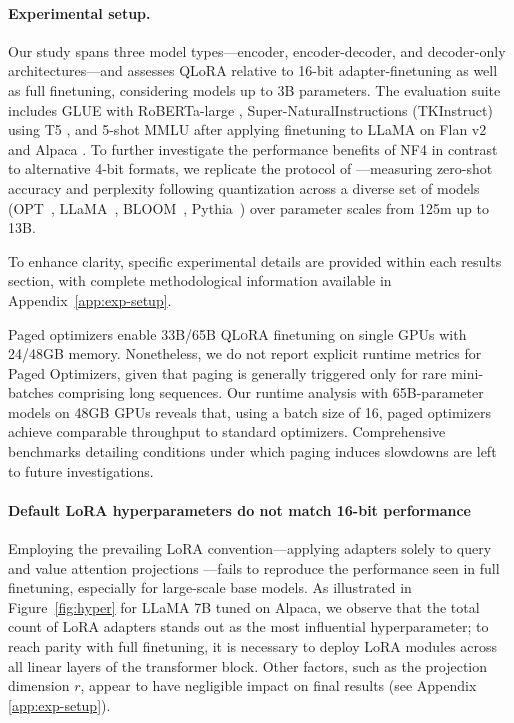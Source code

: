 \paragraph{Experimental setup.} Our study spans three model types—encoder, encoder-decoder, and decoder-only architectures—and assesses QLoRA relative to 16-bit adapter-finetuning as well as full finetuning, considering models up to 3B parameters. The evaluation suite includes GLUE \citep{wang2018glue} with RoBERTa-large \citep{liu2019roberta}, Super-NaturalInstructions (TKInstruct) \citep{wang2022super} using T5 \citep{t5}, and 5-shot MMLU \citep{hendrycksmeasuring} after applying finetuning to LLaMA on Flan v2 \citep{longpre2023flan} and Alpaca \citep{alpaca}. To further investigate the performance benefits of NF4 in contrast to alternative 4-bit formats, we replicate the protocol of \citet{dettmers2022case}—measuring zero-shot accuracy and perplexity following quantization across a diverse set of models (OPT~\citep{zhang2022opt}, LLaMA~\citep{touvron2023llama}, BLOOM~\citep{scao2022bloom}, Pythia~\citep{biderman2023pythia}) over parameter scales from 125m up to 13B.

To enhance clarity, specific experimental details are provided within each results section, with complete methodological information available in Appendix~\ref{app:exp-setup}.

Paged optimizers enable 33B/65B \textsc{QLoRA} finetuning on single GPUs with 24/48GB memory. Nonetheless, we do not report explicit runtime metrics for Paged Optimizers, given that paging is generally triggered only for rare mini-batches comprising long sequences. Our runtime analysis with 65B-parameter models on 48GB GPUs reveals that, using a batch size of 16, paged optimizers achieve comparable throughput to standard optimizers. Comprehensive benchmarks detailing conditions under which paging induces slowdowns are left to future investigations.

\paragraph{Default LoRA hyperparameters do not match 16-bit performance}

Employing the prevailing LoRA convention—applying adapters solely to query and value attention projections \citep{hu2021lora}—fails to reproduce the performance seen in full finetuning, especially for large-scale base models. As illustrated in Figure~\ref{fig:hyper} for LLaMA 7B tuned on Alpaca, we observe that the total count of LoRA adapters stands out as the most influential hyperparameter; to reach parity with full finetuning, it is necessary to deploy LoRA modules across all linear layers of the transformer block. Other factors, such as the projection dimension $r$, appear to have negligible impact on final results (see Appendix \ref{app:exp-setup}).

